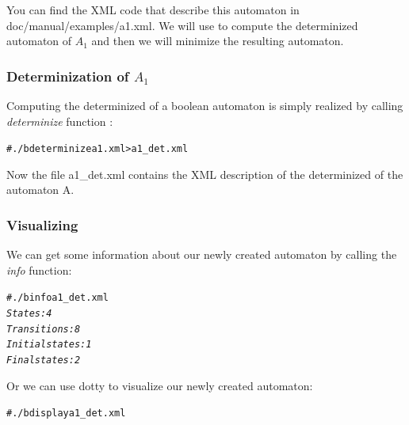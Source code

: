 You can find the XML code that describe this automaton in
doc/manual/examples/a1.xml.
We will use \Vauc to compute the determinized automaton of $A_1$ and
then we will minimize the resulting automaton.

\subsubsection{Determinization of $A_1$}
Computing the determinized of a boolean automaton is simply realized
by calling \textit{determinize} function :
\begin{alltt}
# ./b determinize a1.xml > a1\_det.xml
\end{alltt}
Now the file a1\_det.xml contains the XML description of the
determinized of the automaton A.

\subsubsection{Visualizing}

We can get some information about our newly created automaton by calling
the \textit{info} function:
\begin{alltt}
# ./b info a1\_det.xml
\textit{States: 4
Transitions: 8
Initial states: 1
Final states: 2}
\end{alltt}
Or we can use dotty to visualize our newly created automaton:
\begin{alltt}
# ./b display a1\_det.xml
\end{alltt}

